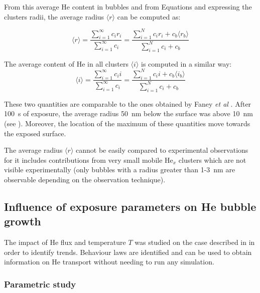From this average He content in bubbles and from Equations  and  expressing the clusters radii, the average radius $\langle r \rangle$ can be computed as:

\begin{equation}
        \langle r \rangle = \frac{\sum\limits_{i=1}^\infty c_i r_i}{\sum\limits_{i=1}^\infty c_i}
        = \frac{\sum\limits_{i=1}^N c_i r_i + c_b \langle r_b \rangle }{\sum\limits_{i=1}^N c_i + c_b}
\end{equation}

The average content of He in all clusters $\langle i \rangle$ is computed in a similar way:
\begin{equation}
        \langle i \rangle = \frac{\sum\limits_{i=1}^\infty c_i i}{\sum\limits_{i=1}^\infty c_i}
        = \frac{\sum\limits_{i=1}^N c_i i + c_b \langle i_b \rangle }{\sum\limits_{i=1}^N c_i + c_b}
\end{equation}

These two quantities are comparable to the ones obtained by Faney \textit{et al} .
After \SI{100}{s} of exposure, the average radius \SI{50}{nm} below the surface was above \SI{10}{nm} (see ).
Moreover, the location of the maximum of these quantities move towards the exposed surface.

The average radius $\langle r \rangle$ cannot be easily compared to experimental observations for it includes contributions from very small mobile He$_x$ clusters which are not visible experimentally (only bubbles with a radius greater than 1-\SI{3}{nm} are observable depending on the observation technique).

\subsection{Influence of exposure parameters on He bubble growth}
The impact of He flux and temperature $T$ was studied on the case described in  in order to identify trends.
Behaviour laws are identified and can be used to obtain information on He transport without needing to run any simulation.

\subsubsection{Parametric study} 

